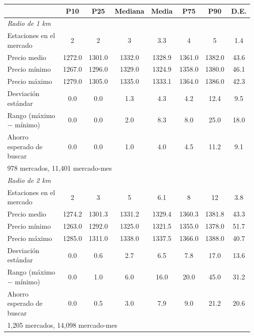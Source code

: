 \begin{tabular}{lccccccc}
\toprule
 & P10 & P25 & Mediana & Media & P75 & P90 & D.E. \\
\midrule
\multicolumn{8}{l}{\emph{Radio de 1 km}} \\
Estaciones en el mercado & 2 & 2 & 3 & 3.3 & 4 & 5 & 1.4 \\
Precio medio & 1272.0 & 1301.0 & 1332.0 & 1328.9 & 1361.0 & 1382.0 & 43.6 \\
Precio mínimo & 1267.0 & 1296.0 & 1329.0 & 1324.9 & 1358.0 & 1380.0 & 46.1 \\
Precio máximo & 1279.0 & 1305.0 & 1335.0 & 1333.1 & 1364.0 & 1386.0 & 42.3 \\
Desviación estándar & 0.0 & 0.0 & 1.3 & 4.3 & 4.2 & 12.4 & 9.5 \\
Rango (máximo $-$ mínimo) & 0.0 & 0.0 & 2.0 & 8.3 & 8.0 & 25.0 & 18.0 \\
Ahorro esperado de buscar & 0.0 & 0.0 & 1.0 & 4.0 & 4.5 & 11.2 & 9.1 \\
\multicolumn{8}{l}{\footnotesize 978 mercados, 11,401 mercado-mes} \\
\midrule
\multicolumn{8}{l}{\emph{Radio de 2 km}} \\
Estaciones en el mercado & 2 & 3 & 5 & 6.1 & 8 & 12 & 3.8 \\
Precio medio & 1274.2 & 1301.3 & 1331.2 & 1329.4 & 1360.3 & 1381.8 & 43.3 \\
Precio mínimo & 1263.0 & 1292.0 & 1325.0 & 1321.5 & 1355.0 & 1378.0 & 51.7 \\
Precio máximo & 1285.0 & 1311.0 & 1338.0 & 1337.5 & 1366.0 & 1388.0 & 40.7 \\
Desviación estándar & 0.0 & 0.6 & 2.7 & 6.5 & 7.8 & 17.0 & 13.6 \\
Rango (máximo $-$ mínimo) & 0.0 & 1.0 & 6.0 & 16.0 & 20.0 & 45.0 & 31.2 \\
Ahorro esperado de buscar & 0.0 & 0.5 & 3.0 & 7.9 & 9.0 & 21.2 & 20.6 \\
\multicolumn{8}{l}{\footnotesize 1,205 mercados, 14,098 mercado-mes} \\
\bottomrule
\end{tabular}
